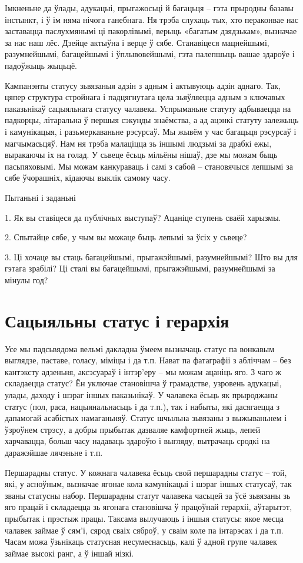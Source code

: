 Імкненьне да ўлады, адукацыі, прыгажосьці й багацьця – гэта прыродны базавы інстынкт, і ў ім няма нічога ганебнага. Ня трэба слухаць тых, хто пераконвае нас заставацца паслухмянымі ці пакорлівымі, верыць «багатым дзядзькам», вызначае за нас наш лёс. Дзейце актыўна і верце ў сябе. Станавіцеся мацнейшымі, разумнейшымі, багацейшымі і ўплывовейшымі, гэта палепшыць вашае здароўе і падоўжыць жыцьцё.

Кампанэнты статусу зьвязаныя адзін з адным і актывуюць адзін аднаго. Так, цяпер структура стройнага і падцягнутага цела зьяўляецца адным з ключавых паказьнікаў сацыяльнага статусу чалавека. Успрыманьне статуту адбываецца на падкорцы, літаральна ў першыя сэкунды знаёмства, а ад ацэнкі статуту залежыць і камунікацыя, і разьмеркаваньне рэсурсаў. Мы жывём у час багацьця рэсурсаў і магчымасьцяў. Нам ня трэба малаціцца зь іншымі людзьмі за драбкі ежы, выракаючы іх на голад. У сьвеце ёсьць мільёны нішаў, дзе мы можам быць пасьпяховымі. Мы можам канкураваць і самі з сабой – становячыся лепшымі за сябе ўчорашніх, кідаючы выклік самому часу.

Пытаньні і заданьні

1. Як вы ставіцеся да публічных выступаў? Ацаніце ступень сваёй харызмы.

2. Спытайце сябе, у чым вы можаце быць лепымі за ўсіх у сьвеце?

3. Ці хочаце вы стаць багацейшымі, прыгажэйшымі, разумнейшымі? Што вы для гэтага зрабілі? Ці сталі вы багацейшымі, прыгажэйшымі, разумнейшымі за мінулы год?


\section{Сацыяльны статус і герархія}

Усе мы падсьвядома вельмі дакладна ўмеем вызначаць статус па вонкавым выглядзе, паставе, голасу, міміцы і да т.п. Нават па фатаграфіі з абліччам – без кантэксту адзеньня, аксэсуараў і інтэр'еру – мы можам ацаніць яго. З чаго ж складаецца статус? Ён уключае становішча ў грамадстве, узровень адукацыі, улады, даходу і шэраг іншых паказьнікаў. У чалавека ёсьць як прыроджаны статус (пол, раса, нацыянальнасьць і да т.п.), так і набыты, які дасягаецца з дапамогай асабістых намаганьняў. Статус шчыльна зьвязаны з выжываньнем і ўзроўнем стрэсу, а добры прыбытак дазваляе камфортней жыць, лепей харчавацца, больш часу надаваць здароўю і выгляду, вытрачаць сродкі на даражэйшае лячэньне і т.п.

Першарадны статус. У кожнага чалавека ёсьць свой першарадны статус – той, які, у асноўным, вызначае ягонае кола камунікацыі і шэраг іншых статусаў, так званы статусны набор. Першарадны статут чалавека часьцей за ўсё зьвязаны зь яго працай і складаецца зь ягонага становішча ў працоўнай герархіі, аўтарытэт, прыбытак і прэстыж працы. Таксама вылучаюць і іншыя статусы: якое месца чалавек займае ў сям'і, сярод сваіх сяброў, у сваім коле па інтарэсах і да т.п. Часам можа ўзьнікаць статусная несумеснасьць, калі ў адной групе чалавек займае высокі ранг, а ў іншай нізкі.

